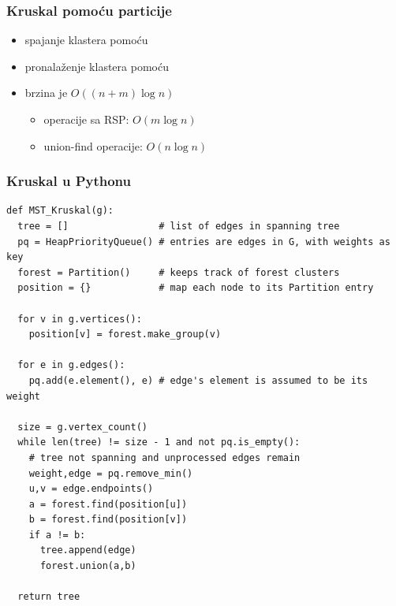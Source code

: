 \documentclass[compress]{beamer}
\begin{document}
\begin{frame}[fragile]
  \frametitle{Kruskal pomoću particije}
  \begin{itemize}
    \item spajanje klastera pomoću 
    \item pronalaženje klastera pomoću 
    \item brzina je $O((n+m)\log n)$
    \begin{itemize}
      \item operacije sa RSP: $O(m\log n)$
      \item union-find operacije: $O(n\log n)$
    \end{itemize}
  \end{itemize}
\end{frame}

\begin{frame}
  \frametitle{Kruskal u Pythonu}
\begin{verbatim}
def MST_Kruskal(g):
  tree = []                # list of edges in spanning tree
  pq = HeapPriorityQueue() # entries are edges in G, with weights as key
  forest = Partition()     # keeps track of forest clusters
  position = {}            # map each node to its Partition entry

  for v in g.vertices():
    position[v] = forest.make_group(v)

  for e in g.edges():
    pq.add(e.element(), e) # edge's element is assumed to be its weight

  size = g.vertex_count()
  while len(tree) != size - 1 and not pq.is_empty():
    # tree not spanning and unprocessed edges remain
    weight,edge = pq.remove_min()
    u,v = edge.endpoints()
    a = forest.find(position[u])
    b = forest.find(position[v])
    if a != b:
      tree.append(edge)
      forest.union(a,b)

  return tree
\end{verbatim}
\end{frame}
\end{document}
